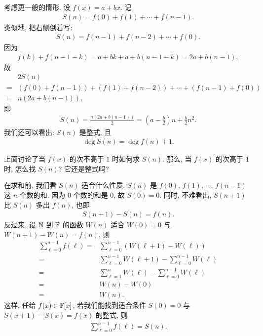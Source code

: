 \begin{example}
    考虑更一般的情形. 设 $f(x) = a + bx$. 记
    \begin{align*}
        S(n) = f(0) + f(1) + \cdots + f(n-1).
    \end{align*}
    类似地, 把右侧倒着写:
    \begin{align*}
        S(n) = f(n-1) + f(n-2) + \cdots + f(0).
    \end{align*}
    因为
    \begin{align*}
        f(k) + f(n-1-k) = a + bk + a + b(n-1-k) = 2a + b(n - 1),
    \end{align*}
    故
    \begin{align*}
             & 2S(n)                                                        \\
        = {} & (f(0) + f(n-1)) + (f(1) + f(n-2)) + \cdots + (f(n-1) + f(0)) \\
        = {} & n(2a + b(n - 1)),
    \end{align*}
    即
    \begin{align*}
        S(n) = \frac{n(2a + b(n - 1))}{2} = \left(a - \frac{b}{2}\right) n + \frac{b}{2} n^2.
    \end{align*}
    我们还可以看出: $S(n)$ 是整式, 且
    \begin{align*}
        \deg S(n) = \deg f(n) + 1.
    \end{align*}
\end{example}

上面讨论了当 $f(x)$ 的次不高于 $1$ 时如何求 $S(n)$. 那么, 当 $f(x)$ 的次高于 $1$ 时, 怎么找 $S(n)$? 它还是整式吗?

在求和前, 我们看 $S(n)$ 适合什么性质. $S(n)$ 是 $f(0)$, $f(1)$, $\cdots$, $f(n-1)$ 这 $n$ 个数的和. 因为 $0$ 个数的和是 $0$, 故 $S(0) = 0$. 同时, 不难看出, $S(n+1)$ 比 $S(n)$ 多出 $f(n)$, 也即
\begin{align*}
    S(n+1) - S(n) = f(n).
\end{align*}
反过来, 设 $\mathbb{N}$ 到 $\mathbb{F}$ 的函数 $W(n)$ 适合 $W(0) = 0$ 与 $W(n+1) - W(n) = f(n)$, 则
\begin{align*}
    \sum_{\ell = 0}^{n - 1} f(\ell)
    = {} & \sum_{\ell = 0}^{n - 1} (W(\ell+1) - W(\ell))                       \\
    = {} & \sum_{\ell = 0}^{n - 1} W(\ell+1) - \sum_{\ell = 0}^{n - 1} W(\ell) \\
    = {} & \sum_{\ell = 1}^{n} W(\ell) - \sum_{\ell = 0}^{n - 1} W(\ell)       \\
    = {} & W(n) - W(0)                                                         \\
    = {} & W(n).
\end{align*}
这样, 任给 $f(x) \in \mathbb{F}[x]$, 若我们能找到适合条件 $S(0) = 0$ 与 $S(x+1) - S(x) = f(x)$ 的整式, 则
\begin{align*}
    \sum_{\ell = 0}^{n - 1} f(\ell) = S(n).
\end{align*}

